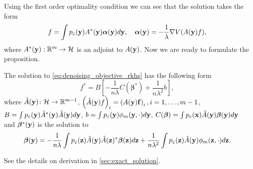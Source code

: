 Using the first order optimality condition we can see that the solution takes the form
\[
    f = \int p_{\varepsilon}({\bf y})A^*({\bf y}){\bm \alpha}({\bf y})d {\bf y},
    \quad
    {\bm \alpha}({\bf y}) = -\frac{1}{\lambda}\nabla V(A({\bf y})f),
\]
where $A^*({\bf y}): \mathbb{R}^m \to \mathcal{H}$ is an adjoint to $A({\bf y})$.
Now we are ready to formulate the proposition.
\begin{proposition}
    The solution to \eqref{eq:denoising_objective_rkhs} has the following form
    \[
        f^* = B \left [
            -\frac{1}{n\lambda}C(\bm{\beta}^*) + \frac{1}{n\lambda^2}b
        \right ],
    \]
    where
    $\hat{A}({\bf y}) \colon \mathcal{H} \to \mathbb{R}^{m - 1}$,
    $\left ( \hat{A}({\bf y})f \right )_i = \left( A(\bf{y})f \right )_i, i=1, \ldots, m-1$,
    \newline
    $B = \int p_{\varepsilon}({\bf y})\hat{A}^*({\bf y})\hat{A}({\bf y}) d{\bf y}$,
    $b = \int p_{\varepsilon}({\bf y})\phi_m({\bf y}, \cdot) d {\bf y}$,
    $C(\bm{\beta}) = \int p_{\varepsilon}({\bf x})\hat{A}({\bf y})\bm{\beta}({\bf y})d{\bf y}$
    and ${\bm\beta}^*({\bf y})$ is the solution to
    \begin{equation}
        \bm{\beta}({\bf y}) = -\frac{1}{n\lambda}
        \int p_{\varepsilon}({\bf z}) \hat{A}({\bf y})\hat{A}({\bf z})^*\bm{\beta}({\bf z})
        d{\bf z}
        + \frac{1}{n\lambda^2}
        \int p_{\varepsilon}({\bf z}) \hat{A}({ \bf y}) \phi_m({\bf z}, \cdot)d{\bf z}.
    \label{eq:beta_integal}
    \end{equation}
\end{proposition}
See the details on derivation in \ref{sec:exact_solution}.


